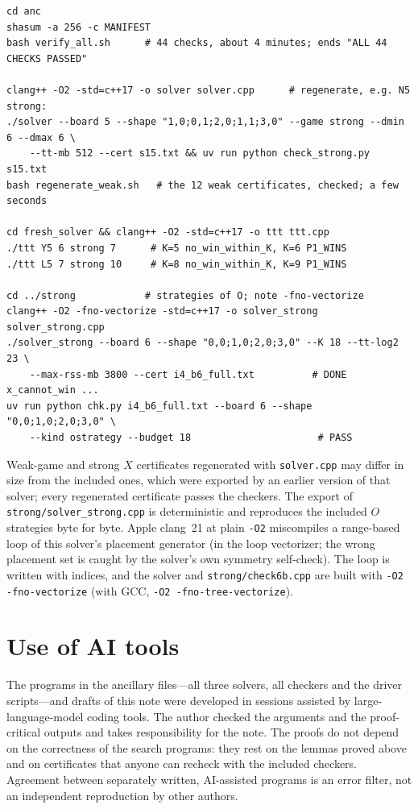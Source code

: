 \documentclass[11pt]{article}
\theoremstyle{definition}
\theoremstyle{remark}
\newcommand{\file}[1]{\texttt{#1}}
\begin{document}
{\small
\begin{verbatim}
cd anc
shasum -a 256 -c MANIFEST
bash verify_all.sh      # 44 checks, about 4 minutes; ends "ALL 44 CHECKS PASSED"

clang++ -O2 -std=c++17 -o solver solver.cpp      # regenerate, e.g. N5 strong:
./solver --board 5 --shape "1,0;0,1;2,0;1,1;3,0" --game strong --dmin 6 --dmax 6 \
    --tt-mb 512 --cert s15.txt && uv run python check_strong.py s15.txt
bash regenerate_weak.sh   # the 12 weak certificates, checked; a few seconds

cd fresh_solver && clang++ -O2 -std=c++17 -o ttt ttt.cpp
./ttt Y5 6 strong 7      # K=5 no_win_within_K, K=6 P1_WINS
./ttt L5 7 strong 10     # K=8 no_win_within_K, K=9 P1_WINS

cd ../strong            # strategies of O; note -fno-vectorize
clang++ -O2 -fno-vectorize -std=c++17 -o solver_strong solver_strong.cpp
./solver_strong --board 6 --shape "0,0;1,0;2,0;3,0" --K 18 --tt-log2 23 \
    --max-rss-mb 3800 --cert i4_b6_full.txt          # DONE x_cannot_win ...
uv run python chk.py i4_b6_full.txt --board 6 --shape "0,0;1,0;2,0;3,0" \
    --kind ostrategy --budget 18                      # PASS
\end{verbatim}
}

\noindent Weak-game and strong $X$ certificates regenerated with \file{solver.cpp} may differ in
size from the included ones, which were exported by an earlier version of that solver; every
regenerated certificate passes the checkers. The export of \file{strong/solver\_strong.cpp} is
deterministic and reproduces the included $O$ strategies byte for byte. Apple clang~21 at plain
\texttt{-O2} miscompiles a range-based loop of this solver's placement generator (in the loop
vectorizer; the wrong placement set is caught by the solver's own symmetry self-check). The loop is
written with indices, and the solver and \file{strong/check6b.cpp} are built with
\texttt{-O2 -fno-vectorize} (with GCC, \texttt{-O2 -fno-tree-vectorize}).

\section*{Use of AI tools}

The programs in the ancillary files---all three solvers, all checkers and the driver scripts---and
drafts of this note were developed in sessions assisted by large-language-model coding tools.
The author checked the arguments and the proof-critical outputs and takes responsibility for the
note. The proofs do not depend on
the correctness of the search programs: they rest on the lemmas proved above and on certificates
that anyone can recheck with the included checkers. Agreement between separately written,
AI-assisted programs is an error filter, not an independent reproduction by other authors.
\end{document}
